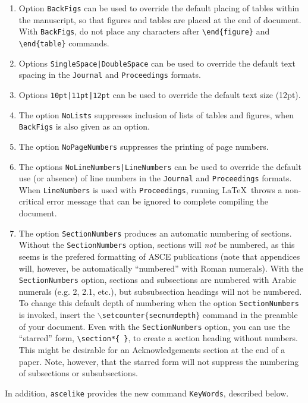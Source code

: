 \documentclass[Proceedings]{ascelike}
\begin{document}
\begin{enumerate}
\begin{itemize}
These interventions are described below in the
section titled ``Preprints'' and are indicated within the
example file \texttt{ascexmpl.tex}.
\end{itemize}
%
\item
Option \verb+BackFigs+ can be used to override 
the default placing of tables within the manuscript,
so that figures and tables are placed at the end of document.
With \verb+BackFigs+, do not place any characters after
\verb+\end{figure}+ and \verb+\end{table}+ commands.
%
\item
Options \verb+SingleSpace|DoubleSpace+ can be used to override 
the default text spacing in the 
\texttt{Journal} and \texttt{Proceedings} formats.
%
\item
Options \verb+10pt|11pt|12pt+ can be used to override the 
default text size (12pt).
%
\item
The option \texttt{NoLists} suppresses inclusion of lists of tables
and figures, when \texttt{BackFigs} is also given as an option.
%
\item
The option \texttt{NoPageNumbers} suppresses the printing of page numbers.
%
\item
The options \verb+NoLineNumbers|LineNumbers+ can be used to override
the default use (or absence) of line numbers in the \texttt{Journal} and
\texttt{Proceedings} formats.
When \verb+LineNumbers+ is used with \texttt{Proceedings},
running \LaTeX\ throws a non-critical error message that can be
ignored to complete compiling the document.
%
\item
The option \texttt{SectionNumbers} produces an automatic numbering of sections.
Without the \texttt{SectionNumbers} option, sections will \emph{not} be
numbered, as this seems is the prefered formatting of ASCE publications 
(note that appendices will, however, be automatically
``numbered'' with Roman numerals).  
With the \texttt{SectionNumbers} option, sections and
subsections are numbered with Arabic numerals (e.g. 2, 2.1, etc.), but
subsubsection headings will not be numbered.  To change this default
depth of numbering when
the option \texttt{SectionNumbers} is invoked, 
insert the \texttt{$\backslash$setcounter$\{$secnumdepth$\}$} command
in the preamble of your document.
Even with the \texttt{SectionNumbers} option, you can use the ``starred''
form, \verb!\section*{ }!, to create a section heading without numbers.
This might be desirable for an Acknowledgements section at the end of
a paper.  Note, however, that the starred form will not suppress
the numbering of subsections or subsubsections.
\end{enumerate}
%
In addition, \texttt{ascelike} provides the new command \verb+KeyWords+,
described below.
%
\end{document}
